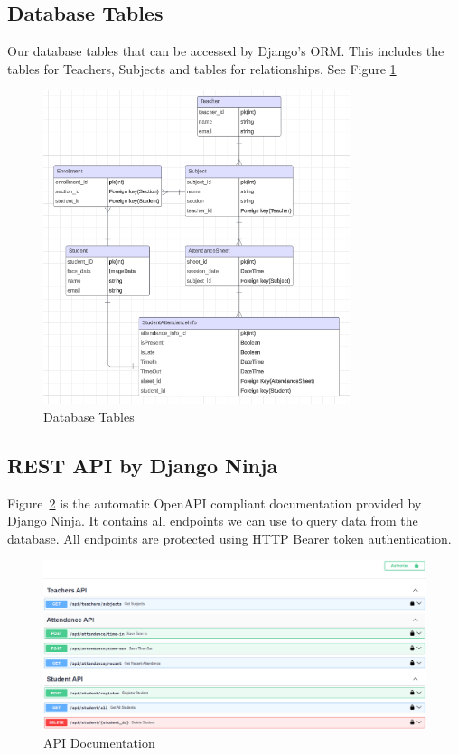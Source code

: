 \subsection{Database Tables}
	Our database tables that can be accessed by Django's ORM. This includes the tables for Teachers, Subjects and tables for relationships. See Figure
	\ref{fig:dbtables}
	\begin{figure}[h] %
		\centering
		\includegraphics[width=0.8\textwidth]{figures/chapter4/dbtables.png} %
		\caption{Database Tables}
		\label{fig:dbtables}
	\end{figure}	
	
\subsection{REST API by Django Ninja}
Figure~\ref{fig:api} is the automatic OpenAPI compliant documentation provided by Django Ninja. It contains all endpoints we can use to query data from the database. All endpoints are protected using HTTP Bearer token authentication.
\begin{figure}[h] %
	\centering
	\includegraphics[width=1\textwidth]{figures/chapter4/api.png} %
	\caption{API Documentation}
	\label{fig:api}
\end{figure}

